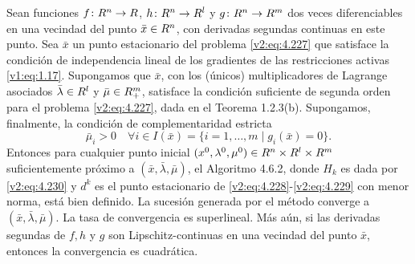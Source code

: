 \begin{theorem}\label{v2:thm:4.6.1}
    Sean funciones $f \colon R^n \to R$, $h \colon R^n \to R^l$ y $g \colon R^n \to R^m$ dos veces diferenciables en una vecindad del punto $\bar{x} \in R^n$, con derivadas segundas continuas en este punto. Sea $\bar{x}$ un punto estacionario del problema \eqref{v2:eq:4.227} que satisface la condición de independencia lineal de los gradientes de las restricciones activas \eqref{v1:eq:1.17}.
    Supongamos que $\bar{x}$, con los (únicos) multiplicadores de Lagrange asociados $\bar{\lambda} \in R^l$ y $\bar{\mu} \in R^m_+$, satisface la condición suficiente de segunda orden para el problema \eqref{v2:eq:4.227}, dada en el Teorema 1.2.3(b).
    Supongamos, finalmente, la condición de complementaridad estricta
    \begin{equation}
        \bar{\mu}_i > 0 \quad \forall i \in I(\bar{x}) = \{i = 1, \dots, m \mid g_i(\bar{x}) = 0\}.
        \label{v2:eq:4.231}
    \end{equation}
    Entonces para cualquier punto inicial $(x^0, \lambda^0, \mu^0) \in R^n \times R^l \times R^m$ suficientemente próximo a $(\bar{x}, \bar{\lambda}, \bar{\mu})$, el Algoritmo 4.6.2, donde $H_k$ es dada por \eqref{v2:eq:4.230} y $d^k$ es el punto estacionario de \eqref{v2:eq:4.228}-\eqref{v2:eq:4.229} con menor norma, está bien definido. La sucesión generada por el método converge a $(\bar{x}, \bar{\lambda}, \bar{\mu})$. La tasa de convergencia es superlineal. Más aún, si las derivadas segundas de $f, h$ y $g$ son Lipschitz-continuas en una vecindad del punto $\bar{x}$, entonces la convergencia es cuadrática.
\end{theorem}
